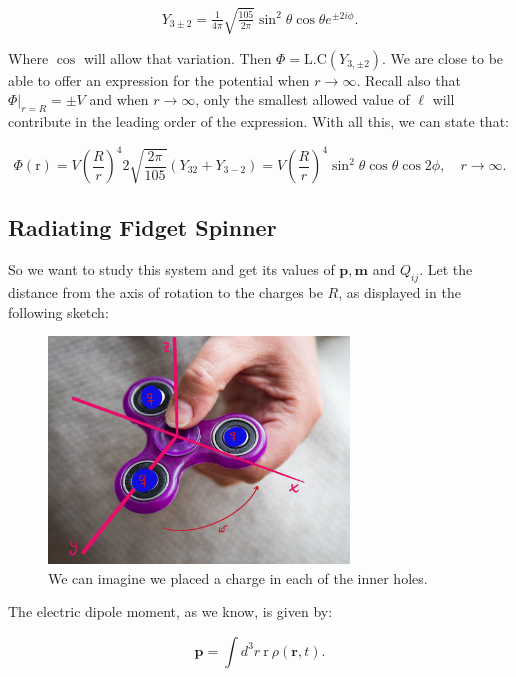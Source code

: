 \begin{equation}
	Y_{3 \pm 2} = \tfrac{1}{4\pi} \sqrt{\tfrac{105}{2\pi}} \sin^{2}\theta \cos \theta e^{\pm 2 i \phi}. 
\end{equation}

Where $\cos$ will allow that variation. Then $\Phi = \text{L.C} \left(Y_{3, \pm2}\right)$. We are close to be able to offer an expression for the potential when $r \rightarrow \infty$. Recall also that $\Phi|_{r=R} = \pm V$ and when $r\rightarrow \infty$, only the smallest allowed value of $\ell$ will contribute in the leading order of the expression. With all this, we can state that: 
	
\begin{equation}
	\Phi(\mathrm{r})=V\left(\frac{R}{r}\right)^{4} 2 \sqrt{\frac{2 \pi}{105}}\left(Y_{32}+Y_{3-2}\right)=V\left(\frac{R}{r}\right)^{4} \sin ^{2} \theta \cos \theta \cos 2 \phi, \quad r \rightarrow \infty.
\end{equation}


\subsection{Radiating Fidget Spinner}\label{Radiating Fidget Spinner}

So we want to study this system and get its values of $\mathbf{p}, \mathbf{m}$ and $Q_{ij}$. Let the distance from the axis of rotation to the charges be $R$, as displayed in the following sketch:

\begin{figure}[h]
	\includegraphics[width=8cm]{figures/Fidgetspinners.png}
	\centering
	\caption{We can imagine we placed a charge in each of the inner holes.}
\end{figure}

The electric dipole moment, as we know, is given by:

\begin{equation}
	\mathbf{p}=\int d^{3} r \:\mathrm{r} \:\rho(\mathbf{r}, t).
\end{equation}

